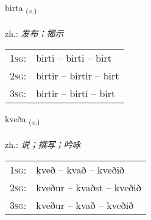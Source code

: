 \documentclass[frontgrid, backgrid]{flacards}\usepackage[]{graphicx}\usepackage[]{xcolor}
\begin{document}
\renewcommand{\flhead}{\vskip5pt \fboxsep=0pt {\small\bfseries\footnotesize Sagnorð | 动词}}
\renewcommand{\fcfoot}{\vskip5pt \fboxsep=0pt \hspace{2pt}{\small\bfseries\footnotesize 1K}}

\renewcommand{\blhead}{\vskip5pt {\small\bfseries\footnotesize Sagnorð | 动词 }}
\renewcommand{\bcfoot}{\vskip5pt \hspace{2pt}{\small\bfseries\footnotesize 1K}}


{birta \small{\textsubscript{(\textit{v.})}} \\[1ex] %
\textphonetic{[pɪr̥ta]} \\
zh.: \emph{发布；揭示} \\  [2ex]
\renewcommand*{\arraystretch}{0.8}
\begin{tabular}{p{1cm}l}
\textsc{1sg}: & birti -- birti -- birt \\ 
\textsc{2sg}: & birtir -- birtir -- birt \\ 
\textsc{3sg}: & birtir -- birti -- birt \\ 
\end{tabular}
}

\renewcommand{\flhead}{\vskip5pt \fboxsep=0pt {\small\bfseries\footnotesize Sagnorð | 动词}}
\renewcommand{\fcfoot}{\vskip5pt \fboxsep=0pt \hspace{2pt}{\small\bfseries\footnotesize 1K}}

\renewcommand{\blhead}{\vskip5pt {\small\bfseries\footnotesize Sagnorð | 动词 }}
\renewcommand{\bcfoot}{\vskip5pt \hspace{2pt}{\small\bfseries\footnotesize 1K}}


{kveða \small{\textsubscript{(\textit{v.})}} \\[1ex] %
\textphonetic{[kʰvɛːða]} \\
zh.: \emph{说；撰写；吟咏} \\  [2ex]
\renewcommand*{\arraystretch}{0.8}
\begin{tabular}{p{1cm}l}
\textsc{1sg}: & kveð -- kvað -- kveðið \\ 
\textsc{2sg}: & kveður -- kvaðst -- kveðið \\ 
\textsc{3sg}: & kveður -- kvað -- kveðið \\ 
\end{tabular}
}
\end{document}
